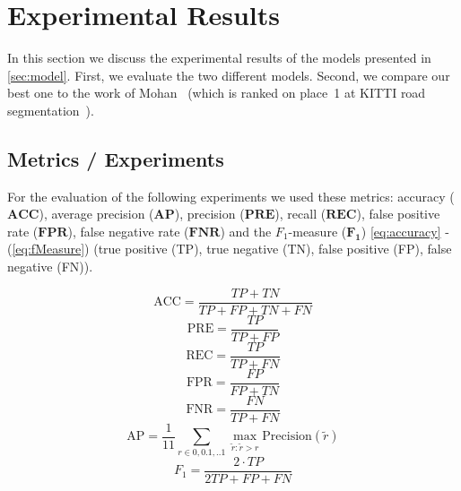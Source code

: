 
\section{Experimental Results}\label{sec:evaluation}

In this section we discuss the experimental results of the models
presented in \cref{sec:model}. First, we evaluate the two different
models. Second, we compare our best one to the work of
Mohan~\cite{Tarel2009} (which is ranked on place~1 at KITTI road
segmentation~\cite{Tarel2009}).


\subsection{Metrics / Experiments}



For the evaluation of the following experiments we used these metrics:
accuracy ($\mathbf{ACC}$), average precision ($\mathbf{AP}$), precision ($\mathbf{PRE}$),  recall ($\mathbf{REC}$), false positive rate ($\mathbf{FPR}$),  false negative rate ($\mathbf{FNR}$)
and the $F_1$-measure ($\mathbf{F_1}$) \cref{eq:accuracy} - (\ref{eq:fMeasure}) (true positive (TP), true negative (TN), false positive (FP), false negative (FN)).

\begin{equation} \label{eq:accuracy}
\text{ACC} = \frac{TP + TN}{TP + FP + TN + FN}
\end{equation}
\begin{equation} \label{eq:precision}
\text{PRE} = \frac{TP}{TP + FP}
\end{equation}
\begin{equation} \label{eq:recall}
\text{REC} = \frac{TP}{TP + FN}
\end{equation}
\begin{equation} \label{eq:fpr}
\text{FPR} = \frac{FP}{FP + TN}
\end{equation}
\begin{equation} \label{eq:fnr}
\text{FNR} = \frac{FN}{TP+ FN}
\end{equation}
\begin{equation} \label{eq:ap}
\text{AP} = \frac{1}{11} \displaystyle\sum_{r \in 0,0.1,..1} \max_{\tilde{r}: \tilde{r} > r} \text{Precision}(\tilde{r})
\end{equation}
\begin{equation} \label{eq:fMeasure}
F_1= \frac{2 \cdot TP}{2TP +FP +FN}
\end{equation}

